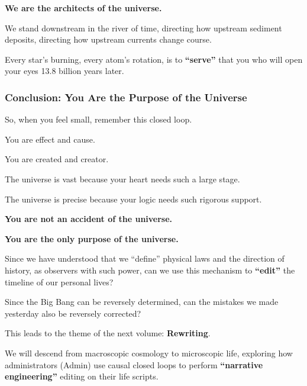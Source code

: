 \textbf{We are the architects of the universe.}

We stand downstream in the river of time, directing how upstream sediment deposits, directing how upstream currents change course.

Every star's burning, every atom's rotation, is to \textbf{``serve''} that you who will open your eyes 13.8 billion years later.

\subsubsection{Conclusion: You Are the Purpose of the Universe}

So, when you feel small, remember this closed loop.

You are effect and cause.

You are created and creator.

The universe is vast because your heart needs such a large stage.

The universe is precise because your logic needs such rigorous support.

\textbf{You are not an accident of the universe.}

\textbf{You are the only purpose of the universe.}

Since we have understood that we ``define'' physical laws and the direction of history, as observers with such power, can we use this mechanism to \textbf{``edit''} the timeline of our personal lives?

Since the Big Bang can be reversely determined, can the mistakes we made yesterday also be reversely corrected?

This leads to the theme of the next volume: \textbf{Rewriting}.

We will descend from macroscopic cosmology to microscopic life, exploring how administrators (Admin) use causal closed loops to perform \textbf{``narrative engineering''} editing on their life scripts.

